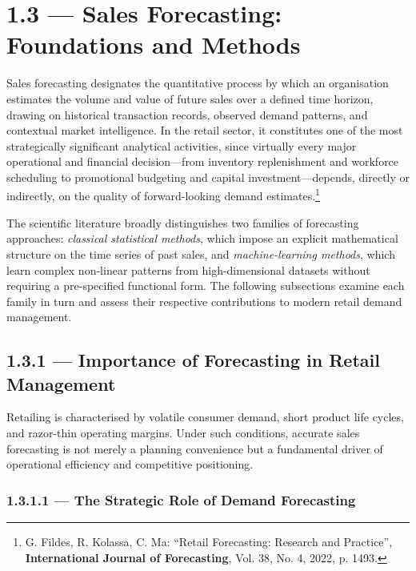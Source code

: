 
\section{1.3 — Sales Forecasting: Foundations and Methods}
\label{sec:1.3}

Sales forecasting designates the quantitative process by which an
organisation estimates the volume and value of future sales over a defined
time horizon, drawing on historical transaction records, observed demand
patterns, and contextual market intelligence. In the retail sector, it
constitutes one of the most strategically significant analytical activities,
since virtually every major operational and financial decision—from inventory
replenishment and workforce scheduling to promotional budgeting and capital
investment—depends, directly or indirectly, on the quality of forward-looking
demand estimates.\footnote{G. Fildes, R. Kolassa, C. Ma: ``Retail
Forecasting: Research and Practice'', \textbf{International Journal of
Forecasting}, Vol. 38, No. 4, 2022, p. 1493.}

The scientific literature broadly distinguishes two families of forecasting
approaches: \textit{classical statistical methods}, which impose an explicit
mathematical structure on the time series of past sales, and
\textit{machine-learning methods}, which learn complex non-linear patterns
from high-dimensional datasets without requiring a pre-specified functional
form. The following subsections examine each family in turn and assess their
respective contributions to modern retail demand management.


\subsection{1.3.1 — Importance of Forecasting in Retail Management}
\label{subsec:1.3.1}

Retailing is characterised by volatile consumer demand, short product life
cycles, and razor-thin operating margins. Under such conditions, accurate
sales forecasting is not merely a planning convenience but a fundamental
driver of operational efficiency and competitive positioning.

\subsubsection{1.3.1.1 — The Strategic Role of Demand Forecasting}

